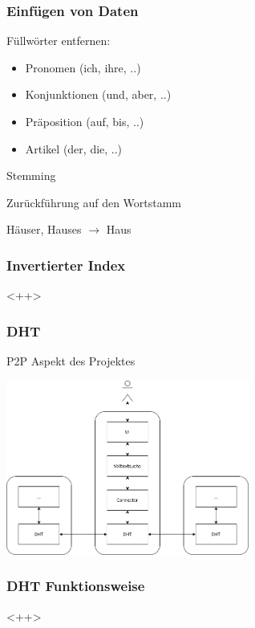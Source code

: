 \documentclass{beamer}
\begin{document}
\begin{frame}[allowframebreaks]
  \frametitle{Einfügen von Daten}

  Füllwörter entfernen:

  \begin{itemize}
    \item Pronomen (ich, ihre, ..)
    \item Konjunktionen (und, aber, ..)
    \item Präposition (auf, bis, ..)
    \item Artikel (der, die, ..)
  \end{itemize}

  \break

  Stemming

  \bigskip

  Zurückführung auf den Wortstamm

  \medskip

  Häuser, Hauses $\rightarrow$ Haus
\end{frame}

\begin{frame}
  \frametitle{Invertierter Index}

  <++>
\end{frame}

\begin{frame}[allowframebreaks]
  \frametitle{DHT}
  P2P Aspekt des Projektes

  \begin{center}
    \includegraphics[width=8cm]{Komponente-verbunden}
  \end{center}
\end{frame}

\begin{frame}
  \frametitle{DHT Funktionsweise}

  <++>
\end{frame}

\end{document}
